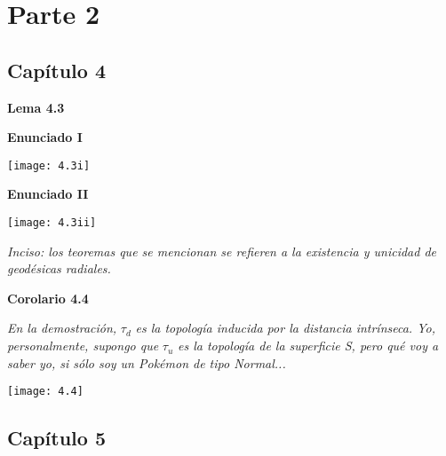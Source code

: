 \documentclass[openany]{book}
\begin{document}
\part{Parte 2}

\chapter{Capítulo 4}


\begin{center}
\textbf{Lema 4.3}
\end{center}

\begin{center}
\textbf{Enunciado I}
\end{center}

\texttt{[image: 4.3i]}


\begin{center}
\textbf{Enunciado II}
\end{center}

\texttt{[image: 4.3ii]}


\textit{Inciso: los teoremas que se mencionan se refieren a la existencia y unicidad de geodésicas radiales.}
\newpage
\begin{center}
\textbf{Corolario 4.4}
\end{center}

\textit{En la demostración, }$\tau_d$\textit{ es la topología inducida por la distancia intrínseca. Yo, personalmente, supongo que }$\tau_u$\textit{ es la topología de la superficie S, pero qué voy a saber yo, si sólo soy un Pokémon de tipo Normal...}

\texttt{[image: 4.4]}


\chapter{Capítulo 5}
\end{document}
